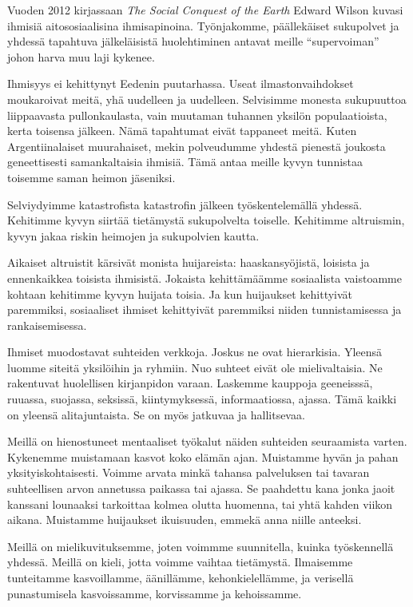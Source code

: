 Vuoden 2012 kirjassaan \emph{The Social Conquest of the Earth} Edward Wilson kuvasi ihmisiä aitososiaalisina ihmisapinoina. Työnjakomme, päällekäiset sukupolvet ja yhdessä tapahtuva jälkeläisistä huolehtiminen antavat meille ``supervoiman'' johon harva muu laji kykenee.

Ihmisyys ei kehittynyt Eedenin puutarhassa. Useat ilmastonvaihdokset moukaroivat meitä, yhä uudelleen ja uudelleen. Selvisimme monesta sukupuuttoa liippaavasta pullonkaulasta, vain muutaman tuhannen yksilön populaatioista, kerta toisensa jälkeen. Nämä tapahtumat eivät tappaneet meitä. Kuten Argentiinalaiset muurahaiset, mekin polveudumme yhdestä pienestä joukosta geneettisesti samankaltaisia ihmisiä. Tämä antaa meille kyvyn tunnistaa toisemme saman heimon jäseniksi.

Selviydyimme katastrofista katastrofin jälkeen työskentelemällä yhdessä. Kehitimme kyvyn siirtää tietämystä sukupolvelta toiselle. Kehitimme altruismin, kyvyn jakaa riskin heimojen ja sukupolvien kautta.

Aikaiset altruistit kärsivät monista huijareista: haaskansyöjistä, loisista ja ennenkaikkea toisista ihmisistä. Jokaista kehittämäämme sosiaalista vaistoamme kohtaan kehitimme kyvyn huijata toisia. Ja kun huijaukset kehittyivät paremmiksi, sosiaaliset ihmiset kehittyivät paremmiksi niiden tunnistamisessa ja rankaisemisessa.

Ihmiset muodostavat suhteiden verkkoja. Joskus ne ovat hierarkisia. Yleensä luomme siteitä yksilöihin ja ryhmiin. Nuo suhteet eivät ole mielivaltaisia. Ne rakentuvat huolellisen kirjanpidon varaan. Laskemme kauppoja geeneisssä, ruuassa, suojassa, seksissä, kiintymyksessä, informaatiossa, ajassa. Tämä kaikki on yleensä alitajuntaista. Se on myös jatkuvaa ja hallitsevaa.

Meillä on hienostuneet mentaaliset työkalut näiden suhteiden seuraamista varten. Kykenemme muistamaan kasvot koko elämän ajan. Muistamme hyvän ja pahan yksityiskohtaisesti. Voimme arvata minkä tahansa palveluksen tai tavaran suhteellisen arvon annetussa paikassa tai ajassa. Se paahdettu kana jonka jaoit kanssani lounaaksi tarkoittaa kolmea olutta huomenna, tai yhtä kahden viikon aikana. Muistamme huijaukset ikuisuuden, emmekä anna niille anteeksi.

Meillä on mielikuvituksemme, joten voimmme suunnitella, kuinka työskennellä yhdessä. Meillä on kieli, jotta voimme vaihtaa tietämystä. Ilmaisemme tunteitamme kasvoillamme, äänillämme, kehonkielellämme, ja verisellä punastumisela kasvoissamme, korvissamme ja kehoissamme.

